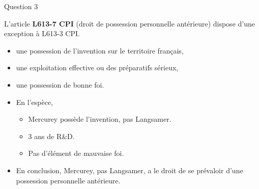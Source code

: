 \begin{frame}{Question 3}

\begin{block}{}
L'article \textbf{L613-7 CPI} (droit
de possession personnelle antérieure) dispose
d'une exception à L613-3 CPI.
\begin{itemize}
  \item une possession de l’invention sur le territoire français,
  \item une exploitation effective ou des préparatifs sérieux,
  \item une possession de bonne foi.
\end{itemize}
\end{block}  

\begin{itemize}
  \item En l'espèce, \begin{itemize}
    \item Mercurey possède l'invention, pas Langsamer.
    \item 3 ans de R\&D.
    \item Pas d'élément de mauvaise foi.
  \end{itemize}
  \item En conclusion, Mercurey, pas Langsamer, a le droit de se
  prévaloir d'une possession personnelle antérieure.
\end{itemize}

\end{frame}